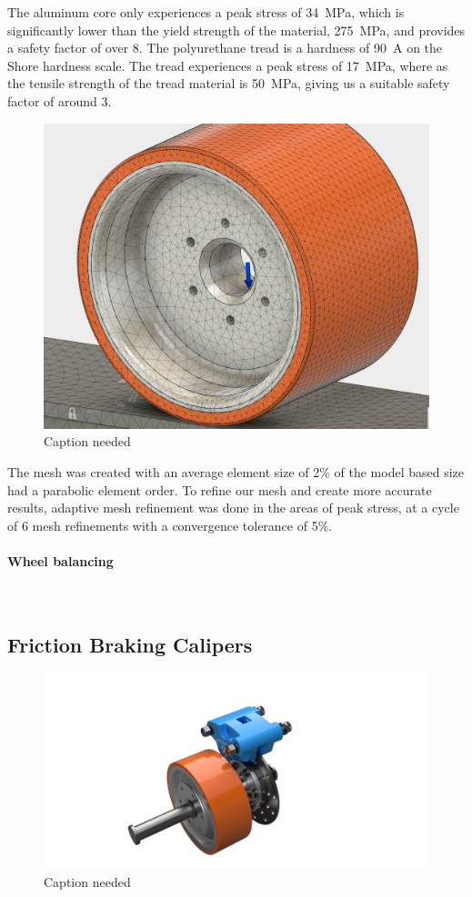 \documentclass{report}
\let\oldparagraph\paragraph
\renewcommand{\paragraph}[1]{\oldparagraph{#1}\mbox{}\\}
\begin{document}
    The aluminum core only experiences a peak stress of \SI{34}{MPa}, which is significantly lower than the yield strength of the material, \SI{275}{MPa}, and provides a safety factor of over 8. The polyurethane tread is a hardness of \SI{90}{A} on the Shore hardness scale. The tread experiences a peak stress of \SI{17}{MPa}, where as the tensile strength of the tread material is \SI{50}{MPa}, giving us a suitable safety factor of around 3.
    \begin{figure}[H]
        \centering
        \includegraphics[width=\linewidth]{images/fig22}
        \caption{Caption needed}
    \end{figure}
    The mesh was created with an average element size of 2\% of the model based size had a parabolic element order. To refine our mesh and create more accurate results, adaptive mesh refinement was done in the areas of peak stress, at a cycle of 6 mesh refinements with a convergence tolerance of 5\%.

    \paragraph{Wheel balancing}
    \subsection{Friction Braking Calipers}
    \begin{figure}[H]
        \centering
        \includegraphics[width=\linewidth]{images/fig23}
        \caption{Caption needed}
    \end{figure}
\end{document}
